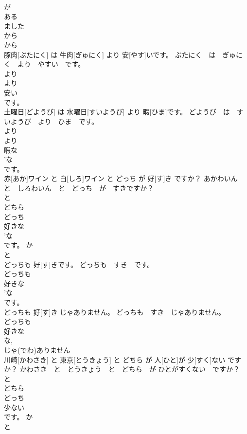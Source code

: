 \documentclass[8pt]{extreport}
\begin{document}
\begin{CJK}{UTF8}{min}
\\	が 
\\	ある 
\\	ました 
\\	から 
\\	から 
\\	豚肉[ぶたにく] は 牛肉[ぎゅにく] より 安[やす]いです。	ぶたにく　は　ぎゅにく　より　やすい　です。	
\\	より 
\\	より 
\\	安い 
\\	です。			
\\	土曜日[どようび] は 水曜日[すいようび] より 暇[ひま]です。	どようび　は　すいようび　より　ひま　です。	
\\	より 
\\	より 
\\	暇な 
\\	'な
\\	です。			
\\	赤[あか]ワイン と 白[しろ]ワイン と どっち が 好[す]き ですか？	あかわいん　と　しろわいん　と　どっち　が　すきですか？	
\\	と 
\\	どちら 
\\	どっち 
\\	好きな 
\\	'な
\\	です。	か 
\\	と 
\\	どっちも 好[す]きです。	どっちも　すき　です。	
\\	どっちも 
\\	好きな 
\\	'な
\\	です。			
\\	どっちも 好[す]き じゃありません。	どっちも　すき　じゃありません。	
\\	どっちも 
\\	好きな 
\\	な, 
\\	じゃ(でわ)ありません	
\\	川崎[かわさき] と 東京[とうきょう] と どちら が 人[ひと]が 少[すく]ない ですか？	かわさき　と　とうきょう　と　どちら　が ひとがすくない　ですか？	
\\	と 
\\	どちら 
\\	どっち 
\\	少ない 
\\	です。	か 
\\	と 

\end{CJK}
\end{document}
